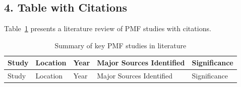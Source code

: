 \documentclass[
  letterpaper,
  oneside,
  openany]{MastersDoctoralThesis}
\theoremstyle{plain}
\theoremstyle{remark}
\begin{document}
\subsection{4. Table with Citations}\label{sec-app-b-citations}

Table~\ref{tbl-app-b-citations} presents a literature review of PMF
studies with citations.

\begin{longtable}[]{@{}
  >{\raggedright\arraybackslash}p{}
  >{\raggedright\arraybackslash}p{}
  >{\raggedright\arraybackslash}p{}
  >{\raggedright\arraybackslash}p{}
  >{\raggedright\arraybackslash}p{}@{}}
\caption{Summary of key PMF studies in
literature}\label{tbl-app-b-citations}\tabularnewline
\toprule\noalign{}
\begin{minipage}[b]{\linewidth}\raggedright
Study
\end{minipage} & \begin{minipage}[b]{\linewidth}\raggedright
Location
\end{minipage} & \begin{minipage}[b]{\linewidth}\raggedright
Year
\end{minipage} & \begin{minipage}[b]{\linewidth}\raggedright
Major Sources Identified
\end{minipage} & \begin{minipage}[b]{\linewidth}\raggedright
Significance
\end{minipage} \\
\midrule\noalign{}
\endfirsthead
\toprule\noalign{}
\begin{minipage}[b]{\linewidth}\raggedright
Study
\end{minipage} & \begin{minipage}[b]{\linewidth}\raggedright
Location
\end{minipage} & \begin{minipage}[b]{\linewidth}\raggedright
Year
\end{minipage} & \begin{minipage}[b]{\linewidth}\raggedright
Major Sources Identified
\end{minipage} & \begin{minipage}[b]{\linewidth}\raggedright
Significance
\end{minipage} \\

\end{longtable}
\end{document}
